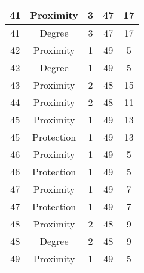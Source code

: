 \documentclass[results.tex]{subfiles}
\begin{document}
\begin{center}
\begin{tabular}{| c || c | c | c | c |}
            \hline
            41                      & Proximity                    & 3                      & 47                      & 17                   \\
            \hline
            41                      & Degree                       & 3                      & 47                      & 17                   \\
            \hline
            42                      & Proximity                    & 1                      & 49                      & 5                    \\
            \hline
            42                      & Degree                       & 1                      & 49                      & 5                    \\
            \hline
            43                      & Proximity                    & 2                      & 48                      & 15                   \\
            \hline
            44                      & Proximity                    & 2                      & 48                      & 11                   \\
            \hline
            45                      & Proximity                    & 1                      & 49                      & 13                   \\
            \hline
            45                      & Protection                   & 1                      & 49                      & 13                   \\
            \hline
            46                      & Proximity                    & 1                      & 49                      & 5                    \\
            \hline
            46                      & Protection                   & 1                      & 49                      & 5                    \\
            \hline
            47                      & Proximity                    & 1                      & 49                      & 7                    \\
            \hline
            47                      & Protection                   & 1                      & 49                      & 7                    \\
            \hline
            48                      & Proximity                    & 2                      & 48                      & 9                    \\
            \hline
            48                      & Degree                       & 2                      & 48                      & 9                    \\
            \hline
            49                      & Proximity                    & 1                      & 49                      & 5                    \\
            \hline
        \end{tabular}
    \end{center}
\end{document}
